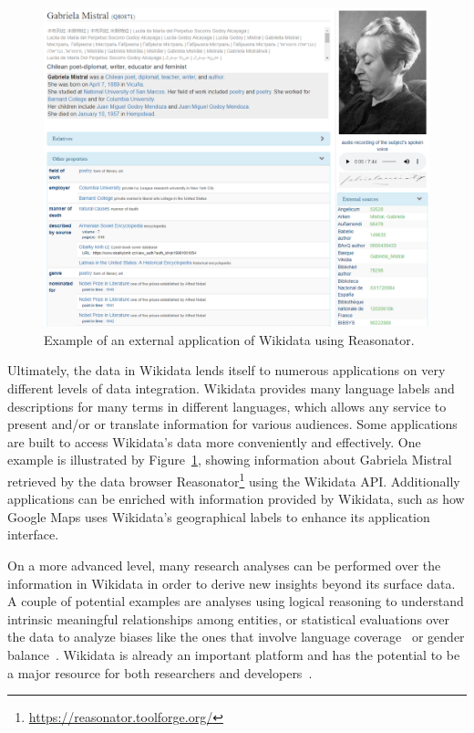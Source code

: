 \begin{figure}[!h]
    \centering
    \includegraphics[scale=.5]{imagenes/2_theorical_framework/wikidataReasonatorExample.PNG}
    \caption{Example of an external application of Wikidata using Reasonator.}
    \label{fig:wikidataReasonator}
\end{figure}

Ultimately, the data in Wikidata lends itself to numerous applications on very different levels 
of data integration. Wikidata provides many language labels and descriptions for many terms in 
different languages, which allows any service to present and/or or translate information for 
various audiences. Some applications are built to access Wikidata’s data more conveniently and 
effectively. One example is illustrated by Figure~\ref{fig:wikidataReasonator}, showing 
information about Gabriela Mistral retrieved by the data browser 
Reasonator\footnote{\url{https://reasonator.toolforge.org/}} using the Wikidata API. Additionally 
applications can be enriched with information provided by Wikidata, such as how Google Maps 
uses Wikidata’s geographical labels to enhance its application interface. 

On a more advanced level, many research analyses can be performed over the information in 
Wikidata in order to derive new insights beyond its surface data. A couple of potential examples 
are analyses using logical reasoning to understand intrinsic meaningful relationships among 
entities, or statistical evaluations over the data to analyze biases like the ones that involve 
language coverage~\cite{key:wikidataHale13} or gender balance~\cite{key:socialWikidataWagner16}. 
Wikidata is already an important platform and has the potential to be a major resource for both 
researchers and developers~\cite{wikidata:GeneWikiInitiative, wikidata:RiseWikidataVrandecic6682924}.
